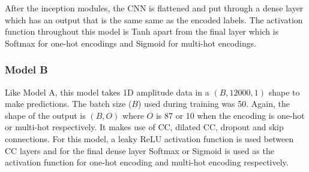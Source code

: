 \documentclass[12pt]{article}
\begin{document}
    After the inception modules, the CNN is flattened and put through a dense layer which has an output that is the same same as the encoded labels. The activation function throughout this model is Tanh apart from the final layer which is Softmax for one-hot encodings and Sigmoid for multi-hot encodings.
    
    \newpage
    \subsubsection{Model B}
    \label{sec:design_modelB}
    
    Like Model A, this model takes 1D amplitude data in a $(B, 12000, 1)$ shape to make predictions. The batch size ($B$) used during training was 50. Again, the shape of the output is $(B, O)$ where $O$ is 87 or 10 when the encoding is one-hot or multi-hot respectively. It makes use of CC, dilated CC, dropout and skip connections. For this model, a leaky ReLU activation function is used between CC layers and for the final dense layer Softmax or Sigmoid is used as the activation function for one-hot encoding and multi-hot encoding respectively.\medskip
\end{document}
